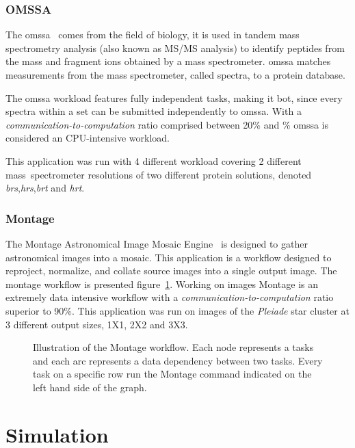 \subsubsection{OMSSA}

The \ac{omssa}~\cite{Geer2004}  comes from the  field of  biology, it is  used in
tandem mass  spectrometry analysis  (also known as  MS/MS analysis)  to identify
peptides   from   the   mass   and    fragment   ions   obtained   by   a   mass
spectrometer. \ac{omssa} matches measurements from the mass spectrometer, called
spectra, to a protein database.

The \ac{omssa}  workload features fully  independent tasks, making  it \ac{bot},
since every spectra  within a set can be submitted  independently to \ac{omssa}.
With a  \emph{communication-to-computation} ratio comprised between  20\% and \%
\ac{omssa} is considered an CPU-intensive workload.

This application was run with 4 different workload covering 2 different
mass~spectrometer resolutions of two different protein solutions, denoted
\emph{brs},\emph{hrs},\emph{brt} and \emph{hrt}.

\subsubsection{Montage}

The Montage  Astronomical Image Mosaic Engine~\cite{montage2009}  is designed to
gather  astronomical images  into  a  mosaic.  This  application  is a  workflow
designed to reproject, normalize, and collate source images into a single output
image. The montage workflow  is presented figure~\ref{fig:montagewf}. Working on
images   Montage   is   an   extremely    data   intensive   workflow   with   a
\emph{communication-to-computation} ratio superior to 90\%. This application was
run on  images of the \emph{Pleiade}  star cluster at 3  different output sizes,
1X1, 2X2 and 3X3.

\begin{figure}[ht]
	
	\caption{Illustration of the Montage workflow. Each node represents a
	tasks and each arc represents a data dependency between two tasks. Every
	task on a specific row run the Montage command indicated on the left
	hand side of the graph.}
	\label{fig:montagewf}
\end{figure}

\section{Simulation}




